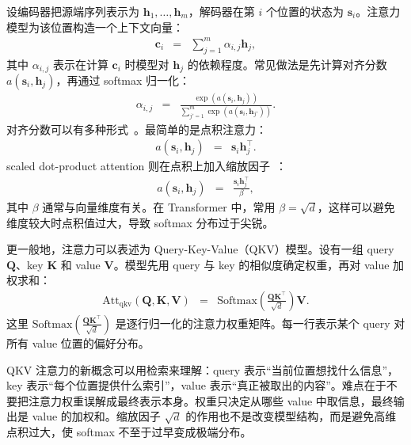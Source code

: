 设编码器把源端序列表示为 $\mathbf{h}_1,\ldots,\mathbf{h}_m$，解码器在第 $i$ 个位置的状态为 $\mathbf{s}_i$。注意力模型为该位置构造一个上下文向量：
\begin{eqnarray}
\mathbf{c}_i
& = &
\sum_{j=1}^{m}\alpha_{i,j}\mathbf{h}_j,
\end{eqnarray}
\noindent 其中 $\alpha_{i,j}$ 表示在计算 $\mathbf{c}_i$ 时模型对 $\mathbf{h}_j$ 的依赖程度。常见做法是先计算对齐分数 $a(\mathbf{s}_i,\mathbf{h}_j)$，再通过 softmax 归一化：
\begin{eqnarray}
\alpha_{i,j}
& = &
\frac{\exp(a(\mathbf{s}_i,\mathbf{h}_j))}
{\sum_{j'=1}^{m}\exp(a(\mathbf{s}_i,\mathbf{h}_{j'}))}.
\end{eqnarray}
对齐分数可以有多种形式~\cite{graves-etal:2014neural,luong-etal:2015effective,chaudhari-etal:2021attentive}。最简单的是点积注意力：
\begin{eqnarray}
a(\mathbf{s}_i,\mathbf{h}_j)
& = &
\mathbf{s}_i\mathbf{h}_j^\top.
\end{eqnarray}
scaled dot-product attention 则在点积上加入缩放因子~\cite{VaswaniEtAl2017Transformer}：
\begin{eqnarray}
a(\mathbf{s}_i,\mathbf{h}_j)
& = &
\frac{\mathbf{s}_i\mathbf{h}_j^\top}{\beta},
\end{eqnarray}
\noindent 其中 $\beta$ 通常与向量维度有关。在 Transformer 中，常用 $\beta=\sqrt{d}$，这样可以避免维度较大时点积值过大，导致 softmax 分布过于尖锐。

更一般地，注意力可以表述为 Query-Key-Value（QKV）模型。设有一组 query $\mathbf{Q}$、key $\mathbf{K}$ 和 value $\mathbf{V}$。模型先用 query 与 key 的相似度确定权重，再对 value 加权求和：
\begin{eqnarray}
\mathrm{Att}_{\mathrm{qkv}}(\mathbf{Q},\mathbf{K},\mathbf{V})
& = &
\mathrm{Softmax}
\left(
\frac{\mathbf{Q}\mathbf{K}^{\top}}{\sqrt{d}}
\right)
\mathbf{V}.
\end{eqnarray}
这里 $\mathrm{Softmax}(\frac{\mathbf{Q}\mathbf{K}^{\top}}{\sqrt{d}})$ 是逐行归一化的注意力权重矩阵。每一行表示某个 query 对所有 value 位置的偏好分布。

\begin{importantnote}
  QKV 注意力的新概念可以用检索来理解：query 表示“当前位置想找什么信息”，key 表示“每个位置提供什么索引”，value 表示“真正被取出的内容”。难点在于不要把注意力权重误解成最终表示本身。权重只决定从哪些 value 中取信息，最终输出是 value 的加权和。缩放因子 $\sqrt{d}$ 的作用也不是改变模型结构，而是避免高维点积过大，使 softmax 不至于过早变成极端分布。
\end{importantnote}

